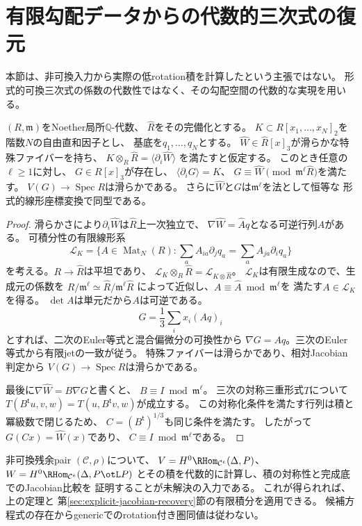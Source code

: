 \section{有限勾配データからの代数的三次式の復元}\label{far:sec:recovery}
本節は、非可換入力から実際の低rotation積を計算したという主張ではない。
形式的可換三次式の係数の代数性ではなく、その勾配空間の代数的な実現を用いる。

\begin{theorem}[局所代数化と任意の有限jet]\label{far:thm:algebraization}
$(R,\mathfrak m)$をNoether局所$\mathbb Q$-代数、
$\widehat R$をその完備化とする。
$K\subset R[x_1,\ldots,x_N]_2$を階数$N$の自由直和因子とし、
基底を$q_1,\ldots,q_N$とする。
$\widehat W\in\widehat R[x]_3$が滑らかな特殊ファイバーを持ち、
$K\otimes_R\widehat R=\langle\partial_i\widehat W\rangle$
を満たすと仮定する。
このとき任意の$\ell\ge1$に対し、
$G\in R[x]_3$が存在し、
$\langle\partial_iG\rangle=K$、
$G\equiv\widehat W\pmod{\mathfrak m^\ell\widehat R}$を満たす。
$V(G)\to\operatorname{Spec}R$は滑らかである。
さらに$\widehat W$と$G$は$\mathfrak m^\ell$を法として恒等な
形式的線形座標変換で同型である。
\end{theorem}
\begin{proof}
滑らかさにより$\partial_i\widehat W$は$\widehat R$上一次独立で、
$\nabla\widehat W=\widehat A q$となる可逆行列$\widehat A$がある。
可積分性の有限線形系
\[
\mathcal L_K=\{A\in\operatorname{Mat}_N(R):
\sum_a A_{ia}\partial_jq_a=\sum_a A_{ja}\partial_iq_a\}
\]
を考える。$R\to\widehat R$は平坦であり、
$\mathcal L_K\otimes_R\widehat R=\mathcal L_{K\otimes\widehat R}$。
$\mathcal L_K$は有限生成なので、生成元の係数を
$R/\mathfrak m^\ell\simeq\widehat R/\mathfrak m^\ell\widehat R$
によって近似し、$A\equiv\widehat A\bmod\mathfrak m^\ell$を
満たす$A\in\mathcal L_K$を得る。
$\det A$は単元だから$A$は可逆である。
\[
G=\frac13\sum_i x_i(Aq)_i
\]
とすれば、二次のEuler等式と混合偏微分の可換性から
$\nabla G=Aq$。三次のEuler等式から有限jetの一致が従う。
特殊ファイバーは滑らかであり、相対Jacobian判定から
$V(G)\to\operatorname{Spec}R$は滑らかである。

最後に$\nabla\widehat W=B\nabla G$と書くと、
$B\equiv I\bmod\mathfrak m^\ell$。
三次の対称三重形式$T$について
$T(B^{\mathsf t}u,v,w)=T(u,B^{\mathsf t}v,w)$が成立する。
この対称化条件を満たす行列は積と冪級数で閉じるため、
$C=(B^{\mathsf t})^{1/3}$も同じ条件を満たす。
したがって$G(Cx)=\widehat W(x)$であり、
$C\equiv I\bmod\mathfrak m^\ell$である。
\end{proof}

\begin{remark}[適用上の核心]
非可換残余pair $(\mathcal C,\rho)$について、
$V=H^0\RHom_{\mathcal C^e}(\Delta,P)$、
$W=H^0\RHom_{\mathcal C^e}(\Delta,P\otL P)$
とその積を代数的に計算し、積の対称性と完成底でのJacobian比較を
証明することが未解決の入力である。
これが得られれば、上の定理と
第\ref{sec:explicit-jacobian-recovery}節の有限積分を適用できる。
候補方程式の存在からgenericでのrotation付き圏同値は従わない。
\end{remark}
